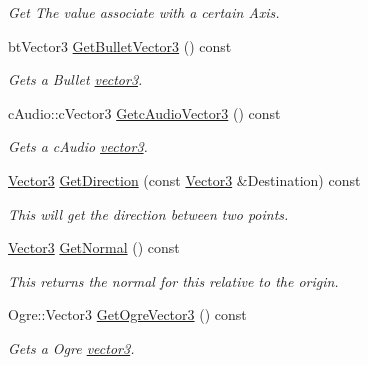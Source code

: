 \begin{DoxyCompactItemize}
\begin{DoxyCompactList}\small\item\em Get The value associate with a certain Axis. \item\end{DoxyCompactList}\item 
btVector3 \hyperlink{classMezzanine_1_1Vector3_ab9fb84bdbfe3bed9fd210a6ad1cee8b7}{GetBulletVector3} () const 
\begin{DoxyCompactList}\small\item\em Gets a Bullet \hyperlink{classvector3}{vector3}. \item\end{DoxyCompactList}\item 
cAudio::cVector3 \hyperlink{classMezzanine_1_1Vector3_abc23c3ed5b31db10992744bf789eb390}{GetcAudioVector3} () const 
\begin{DoxyCompactList}\small\item\em Gets a cAudio \hyperlink{classvector3}{vector3}. \item\end{DoxyCompactList}\item 
\hyperlink{classMezzanine_1_1Vector3}{Vector3} \hyperlink{classMezzanine_1_1Vector3_a707fd0329426f74b38b58d081c585eae}{GetDirection} (const \hyperlink{classMezzanine_1_1Vector3}{Vector3} \&Destination) const 
\begin{DoxyCompactList}\small\item\em This will get the direction between two points. \item\end{DoxyCompactList}\item 
\hyperlink{classMezzanine_1_1Vector3}{Vector3} \hyperlink{classMezzanine_1_1Vector3_a8683a3d640736b5dda63be4a656663a3}{GetNormal} () const 
\begin{DoxyCompactList}\small\item\em This returns the normal for this relative to the origin. \item\end{DoxyCompactList}\item 
Ogre::Vector3 \hyperlink{classMezzanine_1_1Vector3_a2948167508c456d64032acfc8c2f6fd8}{GetOgreVector3} () const 
\begin{DoxyCompactList}\small\item\em Gets a Ogre \hyperlink{classvector3}{vector3}. \item\end{DoxyCompactList}\item 

\end{DoxyCompactItemize}
